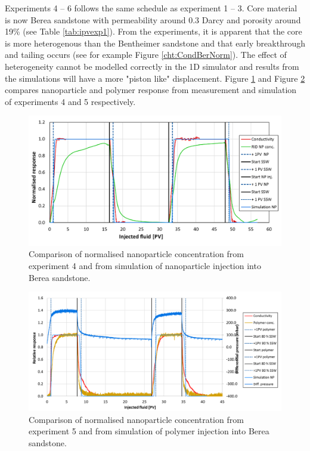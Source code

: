 \documentclass[journal = enfuem, manuscript =  article]{achemso}
\begin{document}
Experiments 4 – 6 follows the same schedule as experiment 1 – 3. Core material is now Berea sandstone with permeability around 0.3 Darcy and porosity around 19\% (see Table \ref{tab:ipvexp1}). From the experiments, it is apparent that the core is more heterogenous than the Bentheimer sandstone and that early breakthrough and tailing occurs (see for example Figure \ref{cht:CondBerNorm}). The effect of heterogeneity cannot be modelled correctly in the 1D simulator and results from the simulations will have a more "piston like" displacement. Figure \ref{cht:simExpNP4} and Figure \ref{cht:simExpNP5} compares nanoparticle and polymer response from measurement and simulation of experiments 4 and 5 respectively. 

\begin{figure}[h]
    \centering
    \includegraphics[width=\textwidth]{fig/simExpNP4.png}
    \caption{Comparison of normalised nanoparticle concentration from experiment 4 and from simulation of nanoparticle injection into Berea sandstone.}
    \label{cht:simExpNP4}
\end{figure}


\begin{figure}[h]
    \centering
    \includegraphics[width=\textwidth]{fig/simExpNP5.png}
    \caption{Comparison of normalised nanoparticle concentration from experiment 5 and from simulation of polymer injection into Berea sandstone.}
    \label{cht:simExpNP5}
\end{figure}
\end{document}
